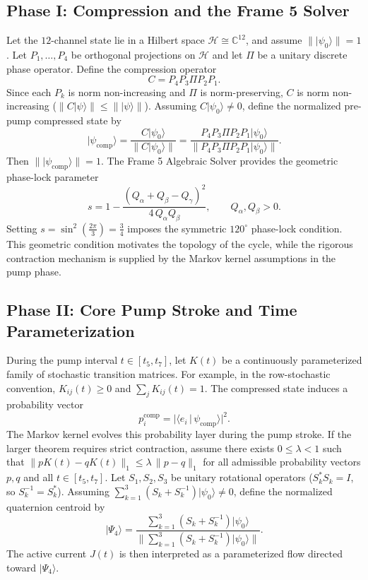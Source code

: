 \documentclass[11pt]{article}
\theoremstyle{plain}
\theoremstyle{definition}
\newcommand{\Hilb}{\mathcal{H}}
\newcommand{\ket}[1]{\lvert #1 \rangle}
\newcommand{\braket}[2]{\langle #1 \,\vert\, #2 \rangle}
\newcommand{\norm}[1]{\lVert #1 \rVert}
\begin{document}
\subsection{Phase I: Compression and the Frame 5 Solver}
Let the $12$-channel state lie in a Hilbert space $\Hilb \cong \mathbb{C}^{12}$,
and assume $\norm{\ket{\psi_0}} = 1$. Let $P_1,\dots,P_4$ be orthogonal
projections on $\Hilb$ and let $\Pi$ be a unitary discrete phase operator. Define
the compression operator
\[
  C = P_4 P_3 \Pi P_2 P_1.
\]
Since each $P_k$ is norm non-increasing and $\Pi$ is norm-preserving, $C$ is norm
non-increasing ($\norm{C\ket{\psi}} \le \norm{\ket{\psi}}$). Assuming
$C\ket{\psi_0} \neq 0$, define the normalized pre-pump compressed state by
\[
  \ket{\psi_{\mathrm{comp}}}
    = \frac{C\ket{\psi_0}}{\norm{C\ket{\psi_0}}}
    = \frac{P_4 P_3 \Pi P_2 P_1 \ket{\psi_0}}
           {\norm{P_4 P_3 \Pi P_2 P_1 \ket{\psi_0}}}.
\]
Then $\norm{\ket{\psi_{\mathrm{comp}}}} = 1$. The Frame 5 Algebraic Solver
provides the geometric phase-lock parameter
\[
  s = 1 - \frac{(Q_\alpha + Q_\beta - Q_\gamma)^{2}}{4\,Q_\alpha Q_\beta},
  \qquad Q_\alpha, Q_\beta > 0.
\]
Setting $s = \sin^{2}\!\left(\tfrac{2\pi}{3}\right) = \tfrac{3}{4}$ imposes the
symmetric $120^\circ$ phase-lock condition. This geometric condition motivates
the topology of the cycle, while the rigorous contraction mechanism is supplied
by the Markov kernel assumptions in the pump phase.

\subsection{Phase II: Core Pump Stroke and Time Parameterization}
During the pump interval $t \in [t_5, t_7]$, let $K(t)$ be a continuously
parameterized family of stochastic transition matrices. For example, in the
row-stochastic convention, $K_{ij}(t) \ge 0$ and $\sum_j K_{ij}(t) = 1$. The
compressed state induces a probability vector
\[
  p_i^{\mathrm{comp}} = \bigl\lvert \braket{e_i}{\psi_{\mathrm{comp}}} \bigr\rvert^{2}.
\]
The Markov kernel evolves this probability layer during the pump stroke. If the
larger theorem requires strict contraction, assume there exists
$0 \le \lambda < 1$ such that
$\norm{pK(t) - qK(t)}_1 \le \lambda\,\norm{p - q}_1$ for all admissible
probability vectors $p,q$ and all $t \in [t_5, t_7]$. Let $S_1, S_2, S_3$ be
unitary rotational operators ($S_k^{\ast} S_k = I$, so $S_k^{-1} = S_k^{\ast}$).
Assuming $\sum_{k=1}^{3}(S_k + S_k^{-1})\ket{\psi_0} \neq 0$, define the
normalized quaternion centroid by
\[
  \ket{\Psi_4}
    = \frac{\sum_{k=1}^{3}(S_k + S_k^{-1})\ket{\psi_0}}
           {\norm{\sum_{k=1}^{3}(S_k + S_k^{-1})\ket{\psi_0}}}.
\]
The active current $J(t)$ is then interpreted as a parameterized flow directed
toward $\ket{\Psi_4}$.
\end{document}
